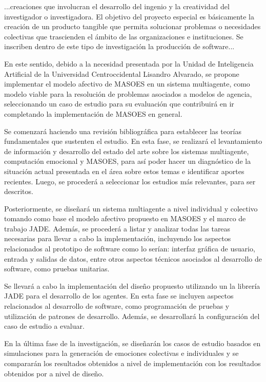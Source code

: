 \begin{citatextual}
...creaciones que involucran el desarrollo del ingenio y la creatividad del
investigador o investigadora. El objetivo del proyecto especial es básicamente
la creación de un producto tangible que permita solucionar problemas o
necesidades colectivas que trascienden el ámbito de las organizaciones e
instituciones. Se inscriben dentro de este tipo de investigación la producción
de software...
\end{citatextual}

En este sentido, debido a la necesidad presentada por la Unidad de Inteligencia
Artificial de la Universidad Centroccidental Lisandro Alvarado, se propone
implementar el modelo afectivo de MASOES en un sistema multiagente, como modelo
viable para la resolución de problemas asociados a modelos de agencia,
seleccionando un caso de estudio para su evaluación que contribuirá en ir
completando la implementación de MASOES en general.



Se comenzará haciendo una revisión bibliográfica para establecer las teorías
fundamentales que sustenten el estudio. En esta fase, se realizará el
levantamiento de información y desarrollo del estado del arte sobre los sistemas
multiagente, computación emocional y MASOES, para así poder hacer un diagnóstico
de la situación actual presentada en el área sobre estos temas e identificar
aportes recientes. Luego, se procederá a seleccionar los estudios más
relevantes, para ser descritos.


Posteriormente, se diseñará un sistema multiagente a nivel individual y
colectivo tomando como base el modelo afectivo propuesto en MASOES y el marco de
trabajo JADE. Además, se procederá a listar y analizar todas las tareas
necesarias para llevar a cabo la implementación, incluyendo los aspectos
relacionados al prototipo de software como lo serían: interfaz gráfica de
usuario, entrada y salidas de datos,  entre otros aspectos técnicos asociados al
desarrollo de software, como pruebas unitarias.


Se llevará a cabo la implementación del diseño propuesto utilizando un la
librería JADE para el desarrollo de los agentes. En esta fase se incluyen
aspectos relacionados al desarrollo de software, como programación de pruebas y
utilización de patrones de desarrollo. Además, se desarrollará la configuración
del caso de estudio a evaluar.


En la última fase de la investigación, se diseñarán los casos de estudio basados
en simulaciones para la generación de emociones colectivas e individuales
y se compararán los resultados obtenidos a nivel de
implementación con los resultados obtenidos por \cite{perozo2011} a nivel de
diseño.
